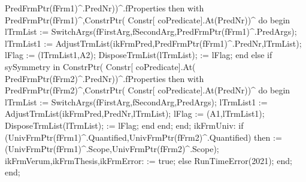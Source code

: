                                                  PredFrmPtr(fFrm1)^.PredNr))^.fProperties then
                     with PredFrmPtr(fFrm1)^,ConstrPtr( Constr[ coPredicate].At(PredNr))^ do
                  begin
                     lTrmList := SwitchArgs(fFirstArg,fSecondArg,PredFrmPtr(fFrm1)^.PredArgs);
                     lTrmList1 := AdjustTrmList(ikFrmPred,PredFrmPtr(fFrm1)^.PredNr,lTrmList);
                     lFlag := (lTrmList1,A2);
                     DisposeTrmList(lTrmList);
                      := lFlag;
                  end
                  else if sySymmetry in ConstrPtr( Constr[ coPredicate].At(
                                                      PredFrmPtr(fFrm2)^.PredNr))^.fProperties then
                     with PredFrmPtr(fFrm2)^,ConstrPtr( Constr[ coPredicate].At(PredNr))^ do
                  begin
                     lTrmList := SwitchArgs(fFirstArg,fSecondArg,PredArgs);
                     lTrmList1 := AdjustTrmList(ikFrmPred,PredNr,lTrmList);
                     lFlag := (A1,lTrmList1);
                     DisposeTrmList(lTrmList);
                      := lFlag;
                  end
               end;
            end;
         ikFrmUniv:
            if (UnivFrmPtr(fFrm1)^.Quantified,UnivFrmPtr(fFrm2)^.Quantified) then
                := (UnivFrmPtr(fFrm1)^.Scope,UnivFrmPtr(fFrm2)^.Scope);
         ikFrmVerum,ikFrmThesis,ikFrmError:
             := true;
      else RunTimeError(2021);
      end;
end;
\eatline
{}\nwendcode{}\nwdocspar
\nwenddocs{}\endmoddef\nwstartdeflinemarkup\nwenddeflinemarkup
